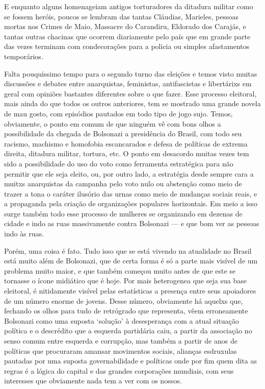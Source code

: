 E enquanto alguns homenageiam antigos torturadores da ditadura militar como se fossem heróis, poucos se lembram das tantas Cláudias, Marieles, pessoas mortas nos Crimes de Maio, Massacre do Carandiru, Eldorado dos Carajás, e tantas outras chacinas que ocorrem diariamente pelo país que em grande parte das vezes terminam com condecorações para a policia ou simples afastamentos temporários.

Falta pouquíssimo tempo para o segundo turno das eleições e temos visto muitas discussões e debates entre anarquistas, feministas, antifascistas e libertárixs em geral com opiniões bastantes diferentes sobre o que fazer. Esse processo eleitoral, mais ainda do que todos os outros anteriores, tem se mostrado uma grande novela de mau gosto, com episódios pautados em todo tipo de jogo sujo. Temos, obviamente, o ponto em comum de que ninguém vê com bons olhos a possibilidade da chegada de Bolsonazi a presidência do Brasil, com todo seu racismo, machismo e homofobia escancarados e defesa de políticas de extrema direita, ditadura militar, tortura, etc.
O ponto em desacordo muitas vezes tem sido a possibilidade do uso do voto como ferramenta estratégica para não permitir que ele seja eleito, ou, por outro lado, a estratégia desde sempre cara a muitxs anarquistas da campanha pelo voto nulo ou abstenção como meio de trazer a tona o caráter ilusório das urnas como meio de mudanças sociais reais, e a propaganda pela criação de organizações populares horizontais. Em meio a isso surge também todo esse processo de mulheres se organizando em dezenas de cidade e indo as ruas massivamente contra Bolsonazi --- e que bom ver as pessoas indo às ruas.

Porém, uma coisa é fato. Tudo isso que se está vivendo na atualidade no Brasil está muito além de Bolsonazi, que de certa forma é só a parte mais visível de um problema muito maior, e que também começou muito antes de que este se tornasse o ícone midiático que é hoje. Por mais heterogenea que seja sua base eleitoral, é nitidamente visível pelas estatísticas a presença entre seus apoiadores de um número enorme de jovens. Desse número, obviamente há aquelxs que, fechando os olhos para tudo de retrógrado que representa, vêem erroneamente Bolsonazi como uma suposta `solução' à desesperança com a atual situação política e o descrédito que a esquerda partidária caiu, a partir da associação no senso comum entre esquerda e corrupção, mas também a partir de anos de políticas que procuraram amansar movimentos sociais, alianças esdruxulas pautadas por uma suposta governabilidade e políticas onde por fim quem dita as regras é a lógica do capital e das grandes corporações mundiais, com seus interesses que obviamente nada tem a ver com os nossos.

